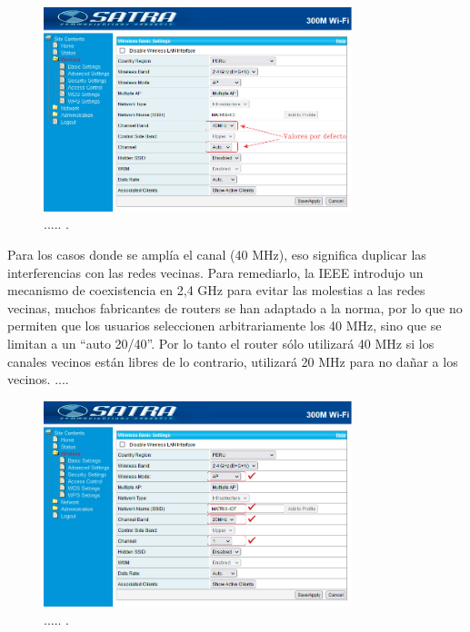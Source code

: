 \begin{figure}[htpb]
\centering 
\includegraphics[width=0.8\textwidth]{./Figures/configuracioncanal.png}
\caption{..... .}
\label{fig:configuracioncanal}
\end{figure}

Para los casos donde se amplía el canal (40 MHz), eso significa duplicar las interferencias con las redes vecinas. Para remediarlo, la IEEE introdujo un mecanismo de coexistencia en 2,4 GHz para evitar las molestias a las redes vecinas, muchos fabricantes de routers se han adaptado a la norma, por lo que no permiten que los usuarios seleccionen arbitrariamente los 40 MHz, sino que se limitan a un ``auto 20/40''. Por lo tanto el router sólo utilizará 40 MHz si los canales vecinos están libres de lo contrario, utilizará 20 MHz para no dañar a los vecinos. ....

\begin{figure}[htpb]
\centering 
\includegraphics[width=0.8\textwidth]{./Figures/configuracionancho.png}
\caption{..... .}
\label{fig:configuracionancho}
\end{figure}


